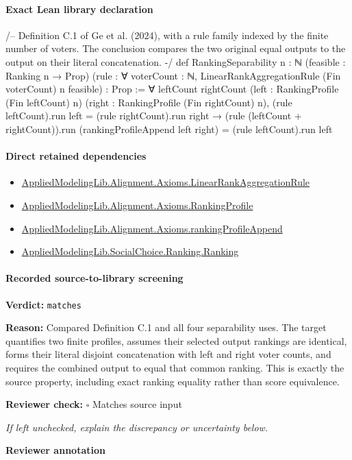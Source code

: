 \documentclass[10pt]{article}
\newcommand{\reviewerbox}{%
  \par\noindent\fbox{\parbox{0.96\linewidth}{\rule{0pt}{0.38in}}}\par
}
\newcommand{\reviewmatch}[1]{%
  \par\noindent\textbf{Reviewer check:} $\square$\; #1\par
  \noindent\emph{If left unchecked, explain the discrepancy or uncertainty below.}\par
}
\begin{document}
\paragraph{Exact Lean library declaration}
\begin{ReviewVerbatim}
/--
Definition C.1 of Ge et al. (2024), with a rule family indexed by the finite
number of voters.  The conclusion compares the two original equal outputs to
the output on their literal concatenation.
-/
def RankingSeparability {n : ℕ} (feasible : Ranking n → Prop)
    (rule : ∀ voterCount : ℕ, LinearRankAggregationRule (Fin voterCount) n feasible) : Prop :=
  ∀ leftCount rightCount
    (left : RankingProfile (Fin leftCount) n)
    (right : RankingProfile (Fin rightCount) n),
      (rule leftCount).run left = (rule rightCount).run right →
        (rule (leftCount + rightCount)).run (rankingProfileAppend left right) =
          (rule leftCount).run left
\end{ReviewVerbatim}

\paragraph{Direct retained dependencies}
\begin{itemize}\raggedright
\item \hyperlink{library-prerequisite-43447e121a1884f9}{Applied\allowbreak{}Modeling\allowbreak{}Lib.\allowbreak{}Alignment.\allowbreak{}Axioms.\allowbreak{}Linear\allowbreak{}Rank\allowbreak{}Aggregation\allowbreak{}Rule}
\item \hyperlink{library-prerequisite-9bded048a60dfe0a}{Applied\allowbreak{}Modeling\allowbreak{}Lib.\allowbreak{}Alignment.\allowbreak{}Axioms.\allowbreak{}Ranking\allowbreak{}Profile}
\item \hyperlink{governing-declaration-eba4ca9f7f54a13c}{Applied\allowbreak{}Modeling\allowbreak{}Lib.\allowbreak{}Alignment.\allowbreak{}Axioms.\allowbreak{}ranking\allowbreak{}Profile\allowbreak{}Append}
\item \hyperlink{library-prerequisite-5cde54446d1ae021}{Applied\allowbreak{}Modeling\allowbreak{}Lib.\allowbreak{}Social\allowbreak{}Choice.\allowbreak{}Ranking.\allowbreak{}Ranking}
\end{itemize}
\paragraph{Recorded source-to-library screening}
\textbf{Verdict:} \texttt{matches}
\\
{\raggedright
\textbf{Reason:} Compared Definition C.\allowbreak{}1 and all four separability uses.\allowbreak{} The target quantifies two finite profiles, assumes their selected output rankings are identical, forms their literal disjoint concatenation with left and right voter counts, and requires the combined output to equal that common ranking.\allowbreak{} This is exactly the source property, including exact ranking equality rather than score equivalence.\allowbreak{}
\par}
\reviewmatch{Matches source input}
\noindent\textbf{Reviewer annotation}\par
\reviewerbox
\clearpage
\hypertarget{library-prerequisite-2a43c1465e4fa011}{}
\end{document}

